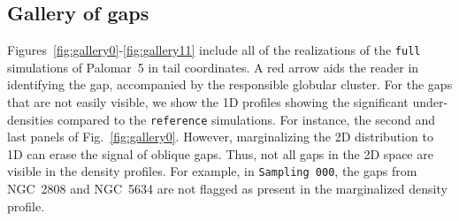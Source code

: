 \documentclass{aa}
\begin{document}
\begin{appendix}




  \section{Gallery of gaps} \label{sec:gallery_of_gaps}
    Figures~\ref{fig:gallery0}-\ref{fig:gallery11} include all of the realizations of the \texttt{full} simulations of Palomar~5 in tail coordinates. A red arrow aids the reader in identifying the gap, accompanied by the responsible globular cluster. For the gaps that are not easily visible, we show the 1D profiles showing the significant under-densities compared to the \texttt{reference} simulations. For instance, the second and last panels of Fig.~\ref{fig:gallery0}. However, marginalizing the 2D distribution to 1D can erase the signal of oblique gaps. Thus, not all gaps in the 2D space are visible in the density profiles. For example, in \texttt{Sampling 000}, the gaps from NGC~2808 and NGC~5634 are not flagged as present in the marginalized density profile.


\end{appendix}
\end{document}
